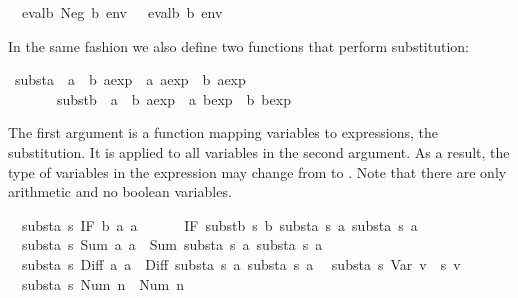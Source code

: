 \begin{isabellebody}
\ \ {\isachardoublequote}evalb\ {\isacharparenleft}Neg\ b{\isacharparenright}\ env\ {\isacharequal}\ {\isacharparenleft}{\isasymnot}\ evalb\ b\ env{\isacharparenright}{\isachardoublequote}%
\begin{isamarkuptext}%
\noindent
In the same fashion we also define two functions that perform substitution:%
\end{isamarkuptext}%
\ substa\ {\isacharcolon}{\isacharcolon}\ {\isachardoublequote}{\isacharparenleft}{\isacharprime}a\ {\isasymRightarrow}\ {\isacharprime}b\ aexp{\isacharparenright}\ {\isasymRightarrow}\ {\isacharprime}a\ aexp\ {\isasymRightarrow}\ {\isacharprime}b\ aexp{\isachardoublequote}\isanewline
\ \ \ \ \ \ \ substb\ {\isacharcolon}{\isacharcolon}\ {\isachardoublequote}{\isacharparenleft}{\isacharprime}a\ {\isasymRightarrow}\ {\isacharprime}b\ aexp{\isacharparenright}\ {\isasymRightarrow}\ {\isacharprime}a\ bexp\ {\isasymRightarrow}\ {\isacharprime}b\ bexp{\isachardoublequote}%
\begin{isamarkuptext}%
\noindent
The first argument is a function mapping variables to expressions, the
substitution. It is applied to all variables in the second argument. As a
result, the type of variables in the expression may change from 
to . Note that there are only arithmetic and no boolean variables.%
\end{isamarkuptext}%
\isanewline
\ \ {\isachardoublequote}substa\ s\ {\isacharparenleft}IF\ b\ a{}\ a{}{\isacharparenright}\ {\isacharequal}\isanewline
\ \ \ \ \ IF\ {\isacharparenleft}substb\ s\ b{\isacharparenright}\ {\isacharparenleft}substa\ s\ a{}{\isacharparenright}\ {\isacharparenleft}substa\ s\ a{}{\isacharparenright}{\isachardoublequote}\isanewline
\ \ {\isachardoublequote}substa\ s\ {\isacharparenleft}Sum\ a{}\ a{}{\isacharparenright}\ {\isacharequal}\ Sum\ {\isacharparenleft}substa\ s\ a{}{\isacharparenright}\ {\isacharparenleft}substa\ s\ a{}{\isacharparenright}{\isachardoublequote}\isanewline
\ \ {\isachardoublequote}substa\ s\ {\isacharparenleft}Diff\ a{}\ a{}{\isacharparenright}\ {\isacharequal}\ Diff\ {\isacharparenleft}substa\ s\ a{}{\isacharparenright}\ {\isacharparenleft}substa\ s\ a{}{\isacharparenright}{\isachardoublequote}\isanewline
\ \ {\isachardoublequote}substa\ s\ {\isacharparenleft}Var\ v{\isacharparenright}\ {\isacharequal}\ s\ v{\isachardoublequote}\isanewline
\ \ {\isachardoublequote}substa\ s\ {\isacharparenleft}Num\ n{\isacharparenright}\ {\isacharequal}\ Num\ n{\isachardoublequote}\isanewline

\end{isabellebody}
